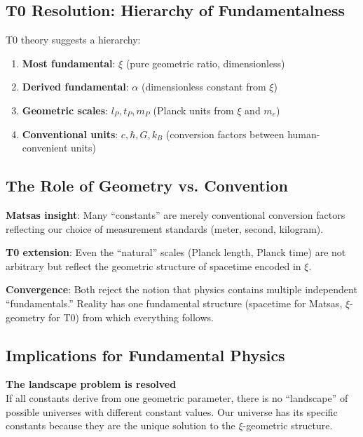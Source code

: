 	\subsection{T0 Resolution: Hierarchy of Fundamentalness}
	
	T0 theory suggests a hierarchy:
	
	\begin{enumerate}
		\item \textbf{Most fundamental}: $\xi$ (pure geometric ratio, dimensionless)
		
		\item \textbf{Derived fundamental}: $\alpha$ (dimensionless constant from $\xi$)
		
		\item \textbf{Geometric scales}: $l_P, t_P, m_P$ (Planck units from $\xi$ and $m_e$)
		
		\item \textbf{Conventional units}: $c, \hbar, G, k_B$ (conversion factors between human-convenient units)
	\end{enumerate}
	
	\subsection{The Role of Geometry vs. Convention}
	
	\textbf{Matsas insight}: Many ``constants'' are merely conventional conversion factors reflecting our choice of measurement standards (meter, second, kilogram).
	
	\textbf{T0 extension}: Even the ``natural'' scales (Planck length, Planck time) are not arbitrary but reflect the geometric structure of spacetime encoded in $\xi$.
	
	\textbf{Convergence}: Both reject the notion that physics contains multiple independent ``fundamentals.'' Reality has one fundamental structure (spacetime for Matsas, $\xi$-geometry for T0) from which everything follows.
	
	\subsection{Implications for Fundamental Physics}
	
	\begin{insight}
		\textbf{The landscape problem is resolved}\\
		If all constants derive from one geometric parameter, there is no ``landscape'' of possible universes with different constant values. Our universe has its specific constants because they are the unique solution to the $\xi$-geometric structure.
	\end{insight}
	

